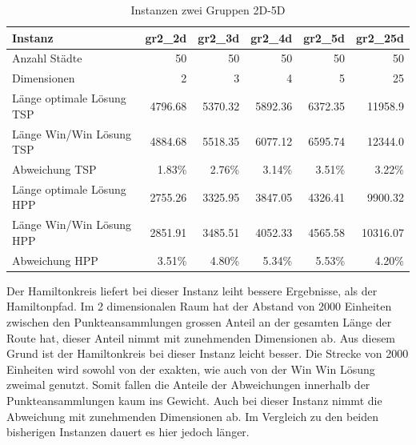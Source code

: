 \documentclass[11pt,a4paper]{article}
\begin{document}
\begin{table}[H]
        \centering
        \begin{tabular}{| l | r | r | r | r | r |}
            \hline
            Instanz                     & \textbf{gr2\_2d}     
                                        & \textbf{gr2\_3d}     
                                        & \textbf{gr2\_4d}     
                                        & \textbf{gr2\_5d}     
                                        & \textbf{gr2\_25d}             \\ \hline
                Anzahl Städte               & 50        & 50       & 50         & 50        & 50        \\ \hline
                Dimensionen                 & 2         & 3        & 4          & 5         & 25        \\ \hline
                Länge optimale Lösung TSP   & 4796.68   & 5370.32  & 5892.36    & 6372.35   & 11958.9   \\ \hline
                Länge Win/Win Lösung  TSP   & 4884.68   & 5518.35  & 6077.12    & 6595.74   & 12344.0   \\ \hline
                Abweichung TSP              &  1.83\%   &  2.76\%  &  3.14\%    &  3.51\%   & 3.22\%    \\ \hline
                Länge optimale Lösung HPP   & 2755.26   & 3325.95  & 3847.05    & 4326.41   & 9900.32   \\ \hline
                Länge Win/Win Lösung  HPP   & 2851.91   & 3485.51  & 4052.33    & 4565.58   & 10316.07  \\ \hline
                Abweichung HPP              &  3.51\%   &  4.80\%  &  5.34\%    &  5.53\%   & 4.20\%    \\ \hline
        \end{tabular}
        \caption{Instanzen zwei Gruppen 2D-5D}
        \label{tab:instanzen_crowds2}
\end{table}

Der Hamiltonkreis liefert bei dieser Instanz leiht bessere Ergebnisse, als der Hamiltonpfad. Im 2 dimensionalen Raum hat der Abstand von 2000 Einheiten zwischen den Punkteansammlungen  grossen Anteil an der gesamten Länge der Route hat, dieser Anteil nimmt mit zunehmenden Dimensionen ab. Aus diesem Grund ist der Hamiltonkreis bei dieser Instanz leicht besser. Die Strecke von 2000 Einheiten wird sowohl von der exakten, wie auch von der Win Win Lösung zweimal genutzt. Somit fallen die Anteile der Abweichungen innerhalb der Punkteansammlungen kaum ins Gewicht.
Auch bei dieser Instanz nimmt die Abweichung mit zunehmenden Dimensionen ab. Im Vergleich zu den beiden bisherigen Instanzen dauert es hier jedoch länger.
\end{document}
